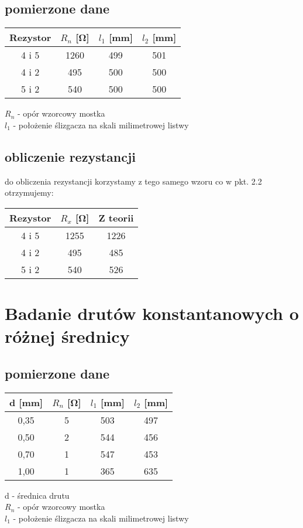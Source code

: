 \documentclass{article}
\begin{document}
\subsection{pomierzone dane}
\begin{center}
\begin{tabular}{ c |  c | c | c}
Rezystor & $R_n$ [\si{\ohm}] & $l_1$ [mm] & $l_2$ [mm]\\
\hline
 4 i 5 & 1260 & 499 & 501\\ 
 4 i 2 & 495 & 500 & 500\\ 
 5 i 2 & 540 & 500 & 500\\ 

\end{tabular}
\end{center}
$R_n$ - opór wzorcowy mostka\\ 
$l_1$ - położenie ślizgacza na skali milimetrowej listwy\\

\subsection{obliczenie rezystancji}
do obliczenia rezystancji korzystamy z tego samego wzoru co w pkt. 2.2\\
otrzymujemy: \\

\begin{center}
\begin{tabular}{ c | c | c}
Rezystor & $R_x$ [\si{\ohm}] & Z teorii\\
\hline
 4 i 5    & 1255 &  1226\\ 
 4 i 2    & 495 & 485\\ 
 5 i 2  & 540 & 526\\ 

 
\end{tabular}
\end{center}

\section{Badanie drutów konstantanowych o różnej średnicy}
\subsection{pomierzone dane}

\begin{center}
\begin{tabular}{ c |  c | c | c}
d [mm] & $R_n$ [\si{\ohm}] & $l_1$ [mm] & $l_2$ [mm]\\
\hline
 0,35 & 5 & 503 & 497\\ 
 0,50 & 2 & 544 & 456\\ 
 0,70 & 1 & 547 & 453\\ 
 1,00 & 1 & 365 & 635\\ 

\end{tabular}
\end{center}
{d} - średnica drutu\\
$R_n$ - opór wzorcowy mostka\\ 
$l_1$ - położenie ślizgacza na skali milimetrowej listwy\\
\end{document}
